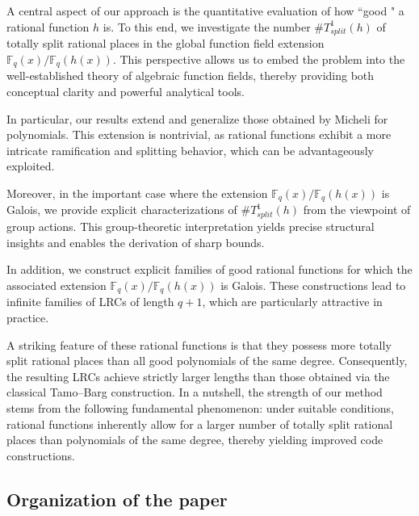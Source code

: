 \documentclass[1p,final]{elsarticle}
\newtheorem{open problem}[theorem]{Open Problem}
\begin{document}
\medskip

A central aspect of our approach is the quantitative evaluation of how ``good " a rational function $h$ is. To this end, we investigate the number $\#T^1_{split}(h)$ of totally split rational places in the global function field extension $\mathbb{F}_{q}(x)/ \mathbb{F}_{q}(h(x))$. This perspective allows us to embed the problem into the well-established theory of algebraic function fields, thereby providing both conceptual clarity and powerful analytical tools.

In particular, our results extend and generalize those obtained by Micheli \cite{Micheli 2020} for polynomials. This extension is nontrivial, as rational functions exhibit a more intricate ramification and splitting behavior, which can be advantageously exploited.

\medskip

Moreover, in the important case where the extension $\mathbb{F}_{q}(x)/ \mathbb{F}_{q}(h(x))$ is Galois, we provide explicit characterizations of $\#T^1_{split}(h)$ from the viewpoint of group actions. This group-theoretic interpretation yields precise structural insights and enables the derivation of sharp bounds.

\medskip

In addition, we construct explicit families of good rational functions for which the associated extension $\mathbb{F}_{q}(x)/ \mathbb{F}_{q}(h(x))$ is Galois. These constructions lead to infinite families of LRCs of length $q+1$, which are particularly attractive in practice.

A striking feature of these rational functions is that they possess more totally split rational places than all good polynomials of the same degree. Consequently, the resulting LRCs achieve strictly larger lengths than those obtained via the classical Tamo--Barg construction. In a nutshell, the strength of our method stems from the following fundamental phenomenon: under suitable conditions, rational functions inherently allow for a larger number of totally split rational places than polynomials of the same degree, thereby yielding improved code constructions.

\subsection*{Organization of the paper}
\end{document}
